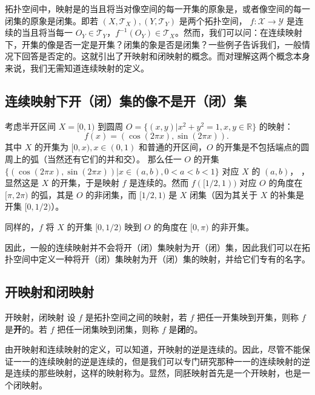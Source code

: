 
拓扑空间中，映射是的当且将当对像空间的每一开集的原象是，或者像空间的每一闭集的原象是闭集。即若 $(X,\mathcal T_X),(Y,\mathcal T_Y)$ 是两个拓扑空间， $f:\mathcal X\rightarrow\mathcal Y$ 是连续的当且将当每一 $O_Y\in\mathcal T_Y$，$f^{-1}(O_Y)\in\mathcal T_X$。然而，我们可以问：在连续映射下，开集的像是否一定是开集？闭集的象是否是闭集？一些例子告诉我们，一般情况下回答是否定的。这就引出了开映射和闭映射的概念。而对理解这两个概念本身来说，我们无需知道连续映射的定义。

\subsection{连续映射下开（闭）集的像不是开（闭）集}
\begin{example}{}
考虑半开区间 $X=[0,1)$ 到圆周 $O=\{(x,y)|x^2+y^2=1,x,y\in\mathbb R\}$ 的映射：
\begin{equation}
f(x)=(\cos(2\pi x),\sin(2\pi x)).~
\end{equation}
其中 $X$ 的开集为 $[0,x),x\in (0,1)$ 和普通的开区间，$O$ 的开集是不包括端点的圆周上的弧（当然还有它们的并和交）。
那么任一 $O$ 的开集 $\{(\cos(2\pi x),\sin(2\pi x))|x\in(a,b),0<a<b<1\}$ 对应 $X$ 的 $(a,b)$，
，显然这是 $X$ 的开集，于是映射 $f$ 是连续的。然而 $f([1/2,1))$ 对应 $O$ 的角度在 $[\pi,2\pi)$ 的弧，其是 $O$ 的非闭集，而 $[1/2,1)$ 是 $X$ 闭集（因为其关于 $X$ 的补集是开集 $[0,1/2)$）。

同样的，$f$ 将 $X$ 的开集 $[0,1/2)$ 映到 $O$ 的角度在 $[0,\pi)$ 的非开集。
\end{example}

因此，一般的连续映射并不会将开（闭）集映射为开（闭）集，因此我们可以在拓扑空间中定义一种将开（闭）集映射为开（闭）集的映射，并给它们专有的名字。

\subsection{开映射和闭映射}

\begin{definition}{开映射，闭映射}
设 $f$ 是拓扑空间之间的映射，若 $f$ 把任一开集映到开集，则称 $f$ 是\textbf{开}的。若 $f$ 把任一闭集映到闭集，则称 $f$ 是\textbf{闭}的。
\end{definition}

由开映射和连续映射的定义，可以知道，开映射的逆是连续的。因此，尽管不能保证一一的连续映射的逆是连续的，但是我们可以专门研究那种一一的连续映射的逆是连续的那些映射，这样的映射称为。显然，同胚映射首先是一个开映射，也是一个闭映射。
